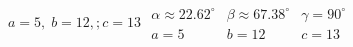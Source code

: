 { $a = 5, \; b = 12,; c = 13$ \label{thirdherons} \label{lastlawofcosines}}
{ $\begin{array}{lll}\alpha \approx 22.62^{\circ} & \beta \approx 67.38^{\circ} & \gamma = 90^{\circ} \\a = 5 & b = 12 & c = 13 \end{array}$}
